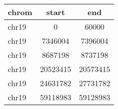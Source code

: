 \documentclass{standalone}
\begin{document}
\begin{tabular}{|l|c|c|}
\toprule
chrom & start & end \\
\midrule
chr19 & 0 & 60000 \\
chr19 & 7346004 & 7396004 \\
chr19 & 8687198 & 8737198 \\
chr19 & 20523415 & 20573415 \\
chr19 & 24631782 & 27731782 \\
chr19 & 59118983 & 59128983 \\
\bottomrule
\end{tabular}
\end{document}
